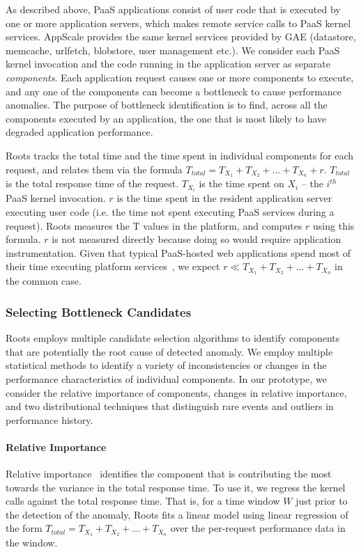 As described above, PaaS applications 
consist of user code that is executed by one or more application servers,
which makes remote service calls to PaaS kernel services. 
AppScale provides the same kernel services provided by GAE (datastore, memcache,
urlfetch, blobstore, user management etc.).
We consider each PaaS kernel invocation and the code running in the application server as 
separate \textit{components}. Each application request causes one or more components to
execute, and any one of the components can become a bottleneck to cause performance anomalies.  
The purpose of bottleneck identification is to find, across all
the components executed by an application, the one that is most likely to have 
degraded application performance.

Roots tracks the total time and the time spent in individual components for each request, 
and relates them via the formula $T_{total} = T_{X_1} + T_{X_2} + ... + T_{X_n} + r$. 
$T_{total}$ is the total response time of the request. $T_{X_i}$ is the time spent on
$X_i$ -- the $i^{th}$ PaaS kernel invocation.  $r$ is the time spent in the resident
application server executing user code (i.e. the time not
spent executing PaaS services during a request). Roots measures the T values in the platform, and
computes $r$ using this formula. $r$ is not measured directly because doing so would require 
application instrumentation. Given that typical PaaS-hosted web
applications spend most of their time executing platform 
services~\cite{Jayathilaka:2015:RTS:2806777.2806842},
we expect $r \ll T_{X_1} + T_{X_2} + ... + T_{X_n}$ in the common case.

\subsubsection{Selecting Bottleneck Candidates}

Roots employs multiple candidate selection algorithms to identify components that are potentially
the root cause of detected anomaly. We employ multiple statistical methods
to identify a variety of inconsistencies or changes in the performance characteristics of 
individual components.  In our prototype, we consider the relative importance of components, 
changes in relative importance, and two 
distributional techniques that distinguish rare events and 
outliers in performance history.

\paragraph*{Relative Importance}
Relative importance~\cite{JSSv017i01} identifies the component that is contributing 
the most towards the variance in the total response time. 
To use it, we regress the kernel calls against the total response time.
That is, for a time window $W$ just prior to the detection of the anomaly, Roots
fits a linear model using linear regression of the form
$T_{total} = T_{X_1} + T_{X_2} + ... + T_{X_n}$
over the per-request performance data in the window.

